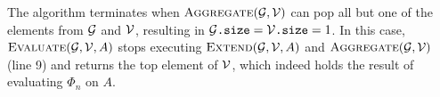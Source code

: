  The algorithm terminates when $\textsc{Aggregate}(\mathcal{G},\mathcal{V})$ can pop all but one of the elements from $\mathcal{G}$ and $\mathcal{V}$, resulting in $\mathcal{G}\texttt{.size} = \mathcal{V}\texttt{.size}=1$. In this case,  $\textsc{Evaluate}(\mathcal{G},\mathcal{V},A)$ stops executing $\textsc{Extend}(\mathcal{G},\mathcal{V},A)$ and $\textsc{Aggregate}(\mathcal{G},\mathcal{V})$ (line 9) and returns the top element of $\mathcal{V}$,
 which indeed holds the result of evaluating $\Phi_n$ on $A$.
%
%
%
%
%
%
%
